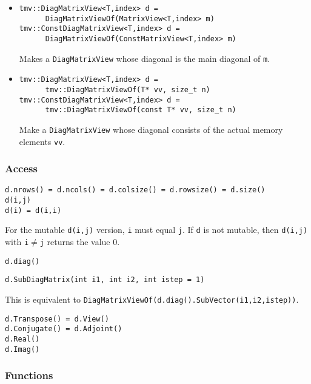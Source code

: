 \documentclass[twoside,letterpaper,11pt]{article}
\renewcommand{\tt}[1]{{\texttt {#1}}}
\begin{document}
\begin{itemize}
\item
\begin{verbatim}
tmv::DiagMatrixView<T,index> d = 
      DiagMatrixViewOf(MatrixView<T,index> m)
tmv::ConstDiagMatrixView<T,index> d = 
      DiagMatrixViewOf(ConstMatrixView<T,index> m)
\end{verbatim}
Makes a \tt{DiagMatrixView} whose diagonal is the main diagonal of \tt{m}.

\item
\begin{verbatim}
tmv::DiagMatrixView<T,index> d = 
      tmv::DiagMatrixViewOf(T* vv, size_t n)
tmv::ConstDiagMatrixView<T,index> d = 
      tmv::DiagMatrixViewOf(const T* vv, size_t n)
\end{verbatim}
Make a \tt{DiagMatrixView} whose diagonal consists of the actual memory elements \tt{vv}.

\end{itemize}


\subsubsection{Access}

\begin{verbatim}
d.nrows() = d.ncols() = d.colsize() = d.rowsize() = d.size()
d(i,j)
d(i) = d(i,i)
\end{verbatim}
For the mutable \tt{d(i,j)} version, 
\tt{i} must equal \tt{j}.
If \tt{d} is not mutable, then \tt{d(i,j)} with \tt{i}$\neq$\tt{j} returns the 
value 0.

\begin{verbatim}
d.diag()
\end{verbatim}

\begin{verbatim}
d.SubDiagMatrix(int i1, int i2, int istep = 1)
\end{verbatim}
This is equivalent to \tt{DiagMatrixViewOf(d.diag().SubVector(i1,i2,istep))}.
\begin{verbatim}
d.Transpose() = d.View()
d.Conjugate() = d.Adjoint()
d.Real()
d.Imag()
\end{verbatim}

\subsubsection{Functions}
\end{document}
